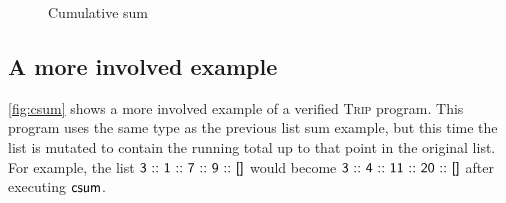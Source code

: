 \documentclass[sigplan,review]{acmart}\settopmatter{printfolios=true,printccs=false,printacmref=false}
\begin{document}
\begin{figure*}
\caption{Cumulative sum}
\label{fig:csum}
\end{figure*}
\subsection{A more involved example}
\autoref{fig:csum} shows a more involved example of a verified \textsc{Trip} program.
This program uses the same  type as the previous list sum example,
but this time the list is mutated to contain the running total up to that point in the original list.
For example, the list
$ \AgdaNumber{3}\ \AgdaInductiveConstructor{::}\ \AgdaNumber{1}\ \AgdaInductiveConstructor{::}\ \AgdaNumber{7}\ \AgdaInductiveConstructor{::}\ \AgdaNumber{9}\ \AgdaInductiveConstructor{::}\ \AgdaInductiveConstructor{[]} $
would become
$ \AgdaNumber{3}\ \AgdaInductiveConstructor{::}\ \AgdaNumber{4}\ \AgdaInductiveConstructor{::}\ \AgdaNumber{11}\ \AgdaInductiveConstructor{::}\ \AgdaNumber{20}\ \AgdaInductiveConstructor{::}\ \AgdaInductiveConstructor{[]} $
after executing $\AgdaFunction{csum}$.
\end{document}
